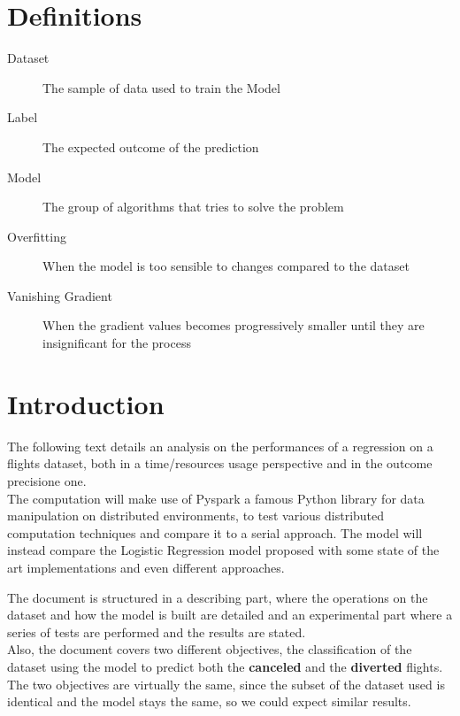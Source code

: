 \documentclass[
	letterpaper, %
	10pt, %
]{class}
\begin{document}
\section{Definitions}\label{definitions} %

\begin{description}
    \item[Dataset] The sample of data used to train the Model
    \item[Label] The expected outcome of the prediction
    \item[Model] The group of algorithms that tries to solve the problem
    \item[Overfitting] When the model is too sensible to changes compared to the dataset
    \item[Vanishing Gradient] When the gradient values becomes progressively smaller until they are insignificant for the process
\end{description}


\section{Introduction}

The following text details an analysis on the performances of a regression on a flights dataset, both in a time/resources usage perspective and in the outcome precisione one.\\
The computation will make use of Pyspark a famous Python library for data manipulation on distributed environments, to test various distributed computation techniques and compare it to a serial approach.
The model will instead compare the Logistic Regression model proposed with some state of the art implementations and even different approaches.

The document is structured in a describing part, where the operations on the dataset and how the model is built are detailed and an experimental part where a series of tests are performed and the results are stated.\\

Also, the document covers two different objectives, the classification of the dataset using the model to predict both the \textbf{canceled} and the \textbf{diverted} flights.\\
The two objectives are virtually the same, since the subset of the dataset used is identical and the model stays the same, so we could expect similar results.\\
\end{document}
